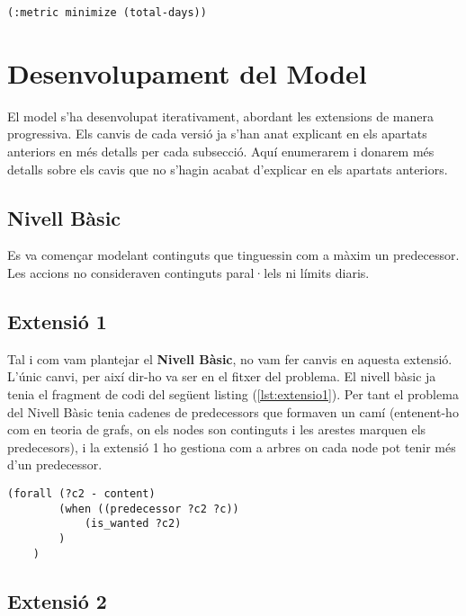\documentclass[a4paper]{article}
\begin{document}
	\begin{lstlisting}[language=PDDL, caption={Exemple de \textit{mètrica} del problema}, label={lst:metric_problema}]
	(:metric minimize (total-days))
	\end{lstlisting}
	
	\newpage
	\section{Desenvolupament del Model}
	
	El model s'ha desenvolupat iterativament, abordant les extensions de manera progressiva. Els canvis de cada versió ja s'han anat explicant en els apartats anteriors en més detalls per cada subsecció. Aquí enumerarem i donarem més detalls sobre els cavis que no s'hagin acabat d'explicar en els apartats anteriors.
	
	\subsection*{Nivell Bàsic}
	
	Es va començar modelant continguts que tinguessin com a màxim un predecessor. Les accions no consideraven continguts paral·lels ni límits diaris.
	
	\subsection*{Extensió 1}
	
	Tal i com vam plantejar el \textbf{Nivell Bàsic}, no vam fer canvis en aquesta extensió. L'únic canvi, per així dir-ho va ser en el fitxer del problema. El nivell bàsic ja tenia el fragment de codi del següent listing (\ref{lst:extensio1}). Per tant el problema del Nivell Bàsic tenia cadenes de predecessors que formaven un camí (entenent-ho com en teoria de grafs, on els nodes son continguts i les arestes marquen els predecesors), i la extensió 1 ho gestiona com a arbres on cada node pot tenir més d'un predecessor. \\
	
	\begin{lstlisting}[language=PDDL, caption={Fragment per assignar més d'un predecessor com a pendent de veure}, label={lst:extensio1}]
	(forall (?c2 - content)
		(when ((predecessor ?c2 ?c))
			(is_wanted ?c2)
		)
	)
	\end{lstlisting}
	
	\subsection*{Extensió 2}
	
\end{document}
